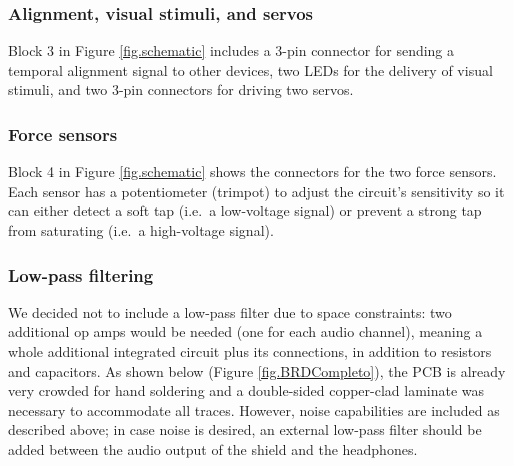 \documentclass[twocolumn]{article}
\begin{document}
\subsubsection{Alignment, visual stimuli, and servos}

Block 3 in Figure \ref{fig.schematic} includes a 3-pin connector for sending a temporal alignment signal to other devices, two LEDs for the delivery of visual stimuli, and two 3-pin connectors for driving two servos.


\subsubsection{Force sensors}

Block 4 in Figure \ref{fig.schematic} shows the connectors for the two force sensors. Each sensor has a potentiometer (trimpot) to adjust the circuit's sensitivity so it can either detect a soft tap (i.e.\ a low-voltage signal) or prevent a strong tap from saturating (i.e.\ a high-voltage signal).


\subsubsection{Low-pass filtering}

We decided not to include a low-pass filter due to space constraints: two additional op amps would be needed (one for each audio channel), meaning a whole additional integrated circuit plus its connections, in addition to resistors and capacitors. As shown below (Figure \ref{fig.BRDCompleto}), the PCB is already very crowded for hand soldering and a double-sided copper-clad laminate was necessary to accommodate all traces. However, noise capabilities are included as described above; in case noise is desired, an external low-pass filter should be added between the audio output of the shield and the headphones.
\end{document}
